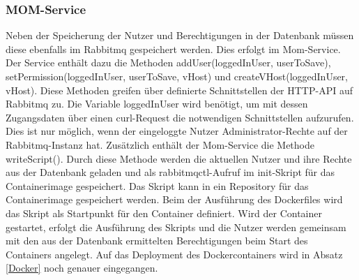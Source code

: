 \subsubsection{MOM-Service}
Neben der Speicherung der Nutzer und Berechtigungen in der Datenbank müssen diese ebenfalls im Rabbitmq gespeichert werden. Dies erfolgt im Mom-Service. Der Service enthält dazu die Methoden addUser(loggedInUser, userToSave), setPermission(loggedInUser, userToSave, vHost) und createVHost(loggedInUser, vHost). Diese Methoden greifen über definierte Schnittstellen der HTTP-API auf Rabbitmq zu. Die Variable loggedInUser wird benötigt, um mit dessen Zugangsdaten über einen curl-Request die notwendigen Schnittstellen aufzurufen. Dies ist nur möglich, wenn der eingeloggte Nutzer Administrator-Rechte auf der Rabbitmq-Instanz hat. Zusätzlich enthält der Mom-Service die Methode writeScript(). Durch diese Methode werden die aktuellen Nutzer und ihre Rechte aus der Datenbank geladen und als rabbitmqctl-Aufruf im init-Skript für das Containerimage gespeichert. Das Skript kann in ein Repository für das Containerimage gespeichert werden. Beim der Ausführung des Dockerfiles  wird das Skript als Startpunkt für den Container definiert. Wird der Container gestartet, erfolgt die Ausführung des Skripts und die Nutzer werden gemeinsam mit den aus der Datenbank ermittelten Berechtigungen beim Start des Containers angelegt. Auf das Deployment des Dockercontainers wird in Absatz \ref{Docker} noch genauer eingegangen.








